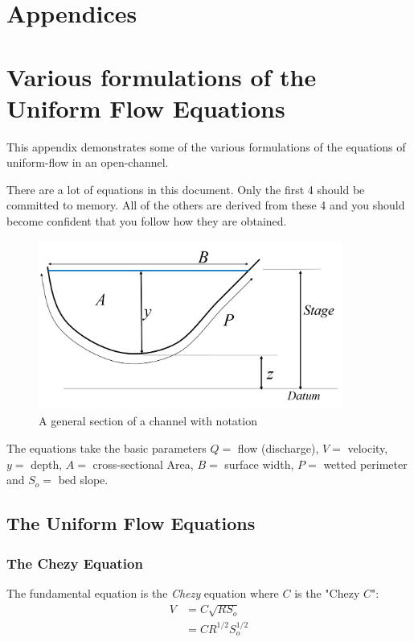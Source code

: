 \documentclass[a4paper, 12pt, british]{article} %
\numberwithin{equation}{section}
\numberwithin{figure}{section}
\numberwithin{table}{section}
\begin{document}

\newpage
\appendix
{}
\section*{Appendices}
\section{Various formulations of the Uniform Flow Equations}
	This appendix demonstrates some of the various formulations of the equations of uniform-flow in an open-channel.
	
	There are a lot of equations in this document. Only the first 4 should be committed to memory. All of the others are derived from these 4 and you should become confident that you follow how they are obtained.
	\begin{figure}[H]
		\centering
		\includegraphics[width=10cm]{./images/section_general.png}
		\caption{A general section of a channel with notation}
		\label{fig:section_general}
	\end{figure}
	The equations take the basic parameters $Q =$ flow (discharge), $V = $ velocity, $y =$ depth, $A =$ cross-sectional Area, $B =$ surface width, $P =$ wetted perimeter and $S_o =$ bed slope.
	
	\subsection*{The Uniform Flow Equations}
	
	\subsubsection*{The Chezy Equation}
	The fundamental equation is the \textit{Chezy} equation where $C$ is the "Chezy $C$":
	\begin{align}
	V &= C\sqrt{RS_o} \nonumber \\
	&= CR^{1/2}S_o^{1/2}
	\label{eqn:chezyv}
	\end{align}
	
\end{document}
